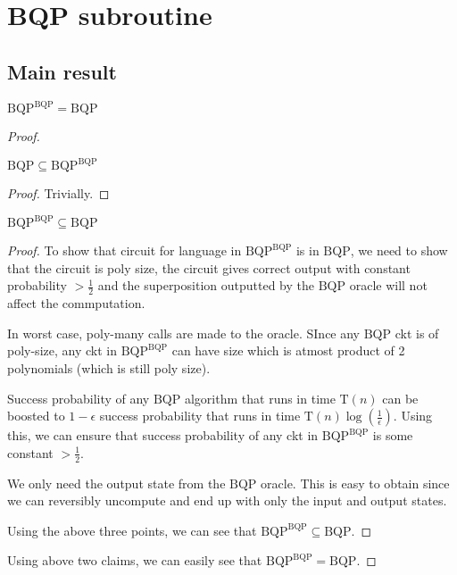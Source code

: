 \documentclass[../main.tex]{subfiles}
\begin{document}
\section{BQP subroutine}

\subsection{Main result}

\begin{theorem}
$\mathrm{BQP}^\mathrm{BQP} = \mathrm{BQP}$ \cite{BBBV97}
\end{theorem}
\begin{proof}
\begin{claim}
$\mathrm{BQP}\subseteq\mathrm{BQP}^\mathrm{BQP}$
\end{claim}
\begin{proof}
Trivially.
\end{proof}
\begin{claim}
$\mathrm{BQP}^\mathrm{BQP}\subseteq\mathrm{BQP}$
\end{claim}
\begin{proof}

To show that circuit for language in $\mathrm{BQP}^\mathrm{BQP}$ is in $\mathrm{BQP}$, we need to show that the circuit is poly size, the circuit gives correct output with constant probability $>\frac{1}{2}$ and the superposition outputted by the $\mathrm{BQP}$ oracle will not affect the commputation.

\noindent In worst case, poly-many calls are made to the oracle. SInce any $\mathrm{BQP}$ ckt is of poly-size, any ckt in $\mathrm{BQP}^\mathrm{BQP}$ can have size which is atmost product of 2 polynomials (which is still poly size).

\noindent Success probability of any $\mathrm{BQP}$ algorithm that runs in time $\mathrm{T}(n)$ can be boosted to $1-\epsilon$ success probability that runs in time $\mathrm{T}(n)\log(\frac{1}{\epsilon})$. Using this, we can ensure that success probability of any ckt in $\mathrm{BQP}^\mathrm{BQP}$ is some constant $>\frac{1}{2}$.

\noindent We only need the output state from the $\mathrm{BQP}$ oracle. This is easy to obtain since we can reversibly uncompute and end up with only the input and output states.

\noindent Using the above three points, we can see that $\mathrm{BQP}^\mathrm{BQP}\subseteq\mathrm{BQP}$.

\end{proof}
\noindent Using above two claims, we can easily see that $\mathrm{BQP}^\mathrm{BQP}=\mathrm{BQP}$.
\end{proof}
\end{document}
